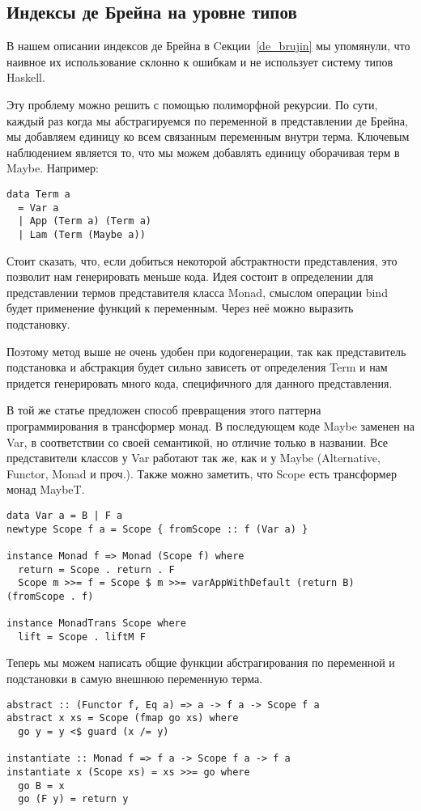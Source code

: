 \subsection{Индексы де Брейна на уровне типов}\label{de_brujin_impl}
В нашем описании индексов де Брейна в Cекции~\ref{de_brujin} мы упомянули, что наивное их использование склонно к ошибкам и не использует систему типов Haskell.

Эту проблему можно решить с помощью полиморфной рекурсии\cite{Bird:Pat}. По сути, каждый раз когда мы абстрагируемся по переменной в представлении де Брейна, мы добавляем единицу ко всем связанным переменным внутри терма. Ключевым наблюдением является то, что мы можем добавлять единицу оборачивая терм в Maybe. Например:

\begin{lstlisting}[frame=single]
data Term a
  = Var a
  | App (Term a) (Term a)
  | Lam (Term (Maybe a))
\end{lstlisting}

Стоит сказать, что, если добиться некоторой абстрактности представления, это позволит нам генерировать меньше кода. Идея состоит в определении для представлении термов представителя класса Monad, смыслом операции bind будет применение функций к переменным. Через неё можно выразить подстановку.

Поэтому метод выше не очень удобен при кодогенерации, так как представитель подстановка и абстракция будет сильно зависеть от определения Term и нам придется генерировать много кода, специфичного для данного представления.

В той же статье предложен способ превращения этого паттерна программирования в трансформер монад. В последующем коде Maybe заменен на Var, в соответствии со своей семантикой, но отличие только в названии. Все представители классов у Var работают так же, как и у Maybe (Alternative, Functor, Monad и проч.). Также можно заметить, что Scope есть трансформер монад MaybeT.

\begin{lstlisting}[frame=single]
data Var a = B | F a
newtype Scope f a = Scope { fromScope :: f (Var a) }

instance Monad f => Monad (Scope f) where
  return = Scope . return . F
  Scope m >>= f = Scope $ m >>= varAppWithDefault (return B) (fromScope . f)

instance MonadTrans Scope where
  lift = Scope . liftM F
\end{lstlisting}

Теперь мы можем написать общие функции абстрагирования по переменной и подстановки в самую внешнюю переменную терма.
\begin{lstlisting}[frame=single]
abstract :: (Functor f, Eq a) => a -> f a -> Scope f a
abstract x xs = Scope (fmap go xs) where
  go y = y <$ guard (x /= y)

instantiate :: Monad f => f a -> Scope f a -> f a
instantiate x (Scope xs) = xs >>= go where
  go B = x
  go (F y) = return y
\end{lstlisting}

